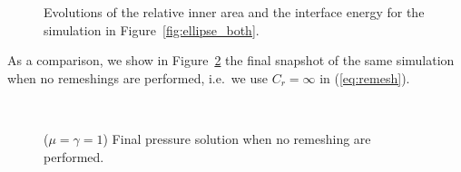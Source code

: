 \documentclass[a4paper,12pt,onecolumn]{article}
\begin{document}
\begin{figure}[htbp]
  \centering
  \caption{Evolutions of the relative inner area and the 
interface energy for the simulation in Figure~\ref{fig:ellipse_both}.}
  \label{fig:ellipse_both_volumes}
\end{figure}
As a comparison, we show in Figure~\ref{fig:ellipse_smooth} the final snapshot
of the same simulation when no remeshings are performed, i.e.\ we use $C_r=
\infty$ in (\ref{eq:remesh}). 
\begin{figure}[htbp]
  \centering
  \\
  \caption{($\mu=\gamma=1$) Final pressure solution when no remeshing are performed.}
  \label{fig:ellipse_smooth}
\end{figure}
\end{document}
